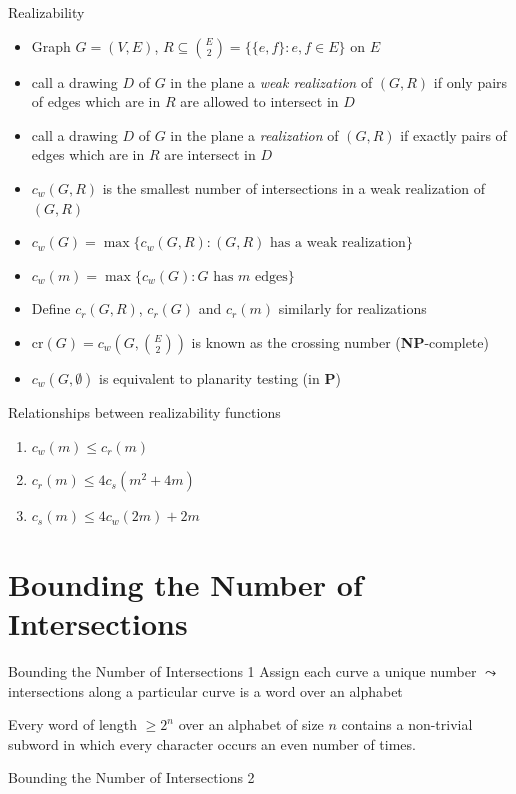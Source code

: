 \documentclass[10pt,aspectratio=169]{beamer}
\theoremstyle{plain} %
\theoremstyle{remark} %
\newcommand{\set}[1]{\{#1\}}
\begin{document}
\begin{frame}{Realizability}
    \begin{itemize}
        \item Graph \(G = (V, E)\), \(R \subseteq \binom{E}{2} = \set{\set{e, f} : e, f \in E} \) on \(E\)
        \item call a drawing \(D\) of \(G\) in the plane a \textit{weak realization} of \((G, R)\) if only pairs of edges which are in \(R\) are allowed to intersect in \(D\)
        \item call a drawing \(D\) of \(G\) in the plane a \textit{realization} of \((G, R)\) if exactly pairs of edges which are in \(R\) are intersect in \(D\)
        \item \(c_w(G, R)\) is the smallest number of intersections in a weak realization of \((G, R)\)
        \item \(c_w(G) = \max\set{c_w(G, R) : (G, R) \text{ has a weak realization}} \)
        \item \(c_w(m) = \max\set{c_w(G) : G \text{ has } m \text{ edges}}\)
        \item Define \(c_r(G, R)\), \(c_r(G)\) and \(c_r(m)\) similarly for realizations
        \item \(\mathrm{cr}(G) = c_w(G, \binom{E}{2})\) is known as the crossing number (\textbf{NP}-complete)
        \item \(c_w(G, \emptyset)\) is equivalent to planarity testing (in \textbf{P})
    \end{itemize}
\end{frame}

\begin{frame}{Relationships between realizability functions}
    \begin{lemma}
        \begin{enumerate}
            \item \(c_w(m) \leq c_r(m)\)
            \item \( c_r(m) \leq 4 c_s(m^2 + 4m) \)
            \item \(c_s(m) \leq 4 c_w(2m) + 2m\)
        \end{enumerate}
    \end{lemma}
\end{frame}

\section{Bounding the Number of Intersections}

\begin{frame}{Bounding the Number of Intersections 1}
    Assign each curve a unique number \(\leadsto\) intersections along a particular curve is a word over an alphabet
    \begin{lemma}
        Every word of length \(\geq 2^n\) over an alphabet of size \(n\) contains a non-trivial subword in which every character occurs an even number of times.
    \end{lemma}
\end{frame}

\begin{frame}{Bounding the Number of Intersections 2}
    \begin{theorem}
        
    \end{theorem}
\end{frame}
\end{document}
